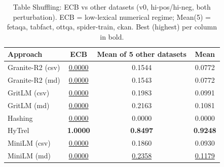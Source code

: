 \begin{table}[t]
\centering
\begin{tabular*}{\textwidth}{lcc|c}
\hline
Approach & ECB & Mean of 5 other datasets & Mean \\
\hline
Granite-R2 (csv) & \underline{0.0000} & 0.1544 & 0.0772 \\
Granite-R2 (md) & \underline{0.0000} & 0.1543 & 0.0772 \\
GritLM (csv) & \underline{0.0000} & 0.1983 & 0.0991 \\
GritLM (md) & \underline{0.0000} & 0.2163 & 0.1081 \\
Hashing & \underline{0.0000} & 0.0000 & 0.0000 \\
HyTrel & \textbf{1.0000} & \textbf{0.8497} & \textbf{0.9248} \\
MiniLM (csv) & \underline{0.0000} & 0.1860 & 0.0930 \\
MiniLM (md) & \underline{0.0000} & \underline{0.2358} & \underline{0.1179} \\
\hline
\end{tabular*}
\caption{Table Shuffling: ECB vs other datasets (v0, hi-pos/hi-neg, both perturbation). ECB = low-lexical numerical regime; Mean(5) = fetaqa, tabfact, ottqa, spider-train, ckan. Best (highest) per column in bold.}
\label{tab:shuffling_ecb}
\end{table}
